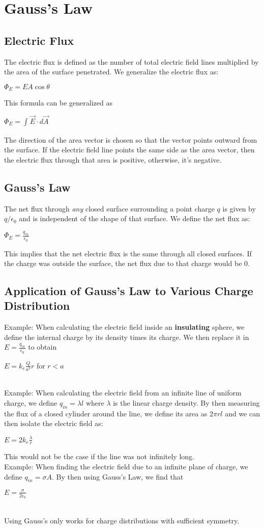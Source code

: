 \documentclass{report}
\begin{document}
\chapter{Gauss's Law}
	\section{Electric Flux}
		The electric flux is defined as the number of total electric field lines multiplied by the area of the surface penetrated. We generalize the electric flux as:\\
		\centerline{$\Phi_E = EA \cos \theta$}
		This formula can be generalized as \\
		\centerline{$\Phi_E = \int_{}^{} \vec{E} \cdot d\vec{A}$}
		The direction of the area vector is chosen so that the vector points outward from the surface. If the electric field line points the same side as the area vector, then the electric flux through that area is positive, otherwise, it's negative.
	\section{Gauss's Law}
		The net flux through \textit{any} closed surface surrounding a point charge $q$ is given by $q/\epsilon_0$ and is independent of the shape of that surface. We define the net flux as:\\
		\centerline{$\Phi_E = \frac{q_{in}}{\epsilon_0}$}
		This implies that the net electric flux is the same through all closed surfaces. If the charge was outside the surface, the net flux due to that charge would be 0.
	\section{Application of Gauss's Law to Various Charge Distribution}
		Example: When calculating the electric field inside an \textbf{insulating }sphere, we define the internal charge by its density times its charge. We then replace it in $E = \frac{q_{in}}{\epsilon_0}$ to obtain\\
		\centerline{$E = k_e \frac{Q}{a^3}r$ for $r<a$}
		\\
		Example: When calculating the electric field from an infinite line of uniform charge, we define $q_{in}=\lambda l$ where $\lambda$ is the linear charge density. By then measuring the flux of a closed cylinder around the line, we define its area as $2\pi rl$ and we can then isolate the electric field as:\\
		\centerline{$E = 2k_e \frac{\lambda}{r}$}
		This would not be the case if the line was not infinitely long.\\
		Example: When finding the electric field due to an infinite plane of charge, we define $q_{in} = \sigma A$. By then using Gauss's Law, we find that \\
		\centerline{$E = \frac{\sigma}{2\epsilon_0}$}
		\\
		Using Gauss's only works for charge distributions with sufficient symmetry.
\end{document}
